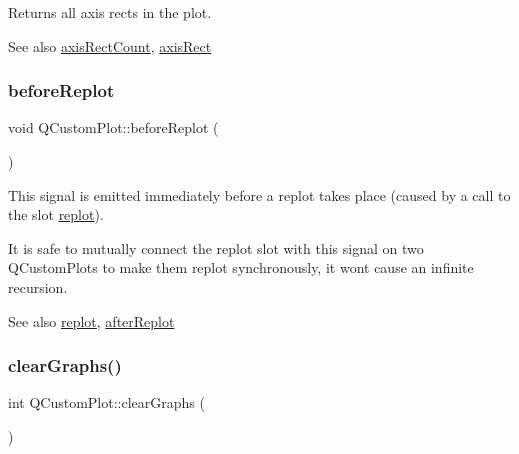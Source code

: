 Returns all axis rects in the plot.

\begin{DoxySeeAlso}{See also}
\hyperlink{class_q_custom_plot_a8f85940aaac50efb466287d9d2d04ec6}{axis\+Rect\+Count}, \hyperlink{class_q_custom_plot_ae5eefcb5f6ca26689b1fd4f6e25b42f9}{axis\+Rect} 
\end{DoxySeeAlso}
\mbox{\label{class_q_custom_plot_a0cd30e29b73efd6afe096e44bc5956f5}} 
\subsubsection{\texorpdfstring{before\+Replot}{beforeReplot}}
{\footnotesize\ttfamily void Q\+Custom\+Plot\+::before\+Replot (\begin{DoxyParamCaption}{ }\end{DoxyParamCaption})\hspace{0.3cm}{\ttfamily [signal]}}

This signal is emitted immediately before a replot takes place (caused by a call to the slot \hyperlink{class_q_custom_plot_aa4bfe7d70dbe67e81d877819b75ab9af}{replot}).

It is safe to mutually connect the replot slot with this signal on two Q\+Custom\+Plots to make them replot synchronously, it won\textquotesingle{}t cause an infinite recursion.

\begin{DoxySeeAlso}{See also}
\hyperlink{class_q_custom_plot_aa4bfe7d70dbe67e81d877819b75ab9af}{replot}, \hyperlink{class_q_custom_plot_a6f4fa624af060bc5919c5f266cf426a0}{after\+Replot} 
\end{DoxySeeAlso}
\mbox{\label{class_q_custom_plot_ab0f3abff2d2f7df3668b5836f39207fa}} 
\subsubsection{\texorpdfstring{clear\+Graphs()}{clearGraphs()}}
{\footnotesize\ttfamily int Q\+Custom\+Plot\+::clear\+Graphs (\begin{DoxyParamCaption}{ }\end{DoxyParamCaption})}

